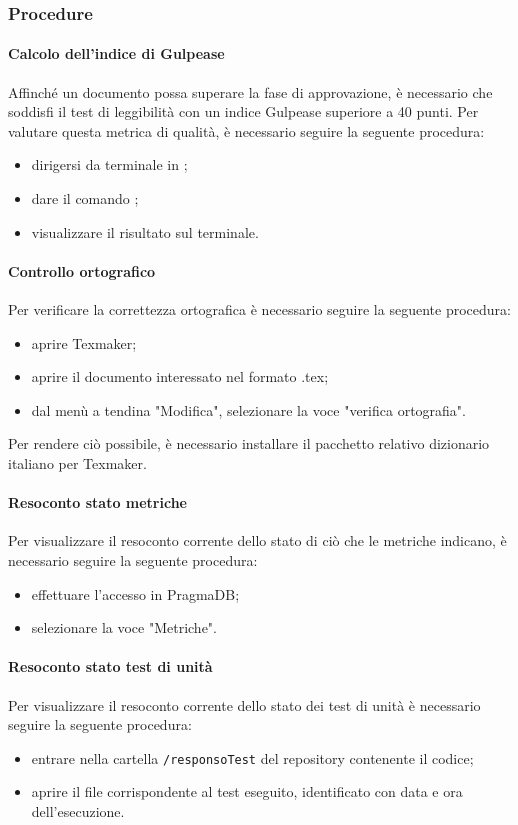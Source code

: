 \subsubsection{Procedure}
\paragraph{Calcolo dell'indice di Gulpease}
Affinché un documento possa superare la fase di approvazione, è necessario che soddisfi il test di leggibilità con un indice Gulpease superiore a 40 punti. Per valutare questa metrica di qualità, è necessario seguire la seguente procedura:
\begin{itemize}
	\item dirigersi da terminale in \GulScript{};
	\item dare il comando ;
	\item visualizzare il risultato sul terminale.
\end{itemize}
\paragraph{Controllo ortografico}
Per verificare la correttezza ortografica è necessario seguire la seguente procedura:
\begin{itemize}
	\item aprire Texmaker;
	\item aprire il documento interessato nel formato .tex;
	\item dal menù a tendina "Modifica", selezionare la voce "verifica ortografia".
\end{itemize}
Per rendere ciò possibile, è necessario installare il pacchetto relativo dizionario italiano per Texmaker.
\paragraph{Resoconto stato metriche}\label{res_metriche}
Per visualizzare il resoconto corrente dello stato di ciò che le metriche indicano, è necessario seguire la seguente procedura:
\begin{itemize}
	\item effettuare l'accesso in PragmaDB;
	\item selezionare la voce "Metriche".
\end{itemize}
\paragraph{Resoconto stato test di unità}
Per visualizzare il resoconto corrente dello stato dei test di unità è necessario seguire la seguente procedura:
\begin{itemize}
	\item entrare nella cartella \texttt{/responsoTest} del repository contenente il codice;
	\item aprire il file corrispondente al test eseguito, identificato con data e ora dell'esecuzione.
\end{itemize}
